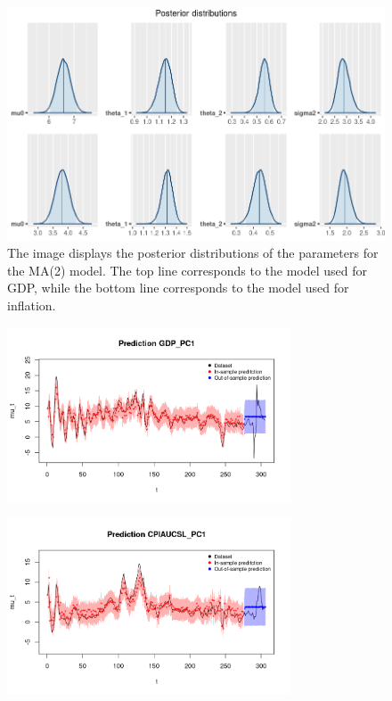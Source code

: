 \begin{figure}[H]
    \centering
    \includegraphics[width=\textwidth]{images/3-MA/posteriors2.png}
    \caption{The image displays the posterior distributions of the parameters for the MA(2) model. The top line corresponds to the model used for GDP, while the bottom line corresponds to the model used for inflation.}
    \label{fig:MA2_posteriors}
\end{figure}

\begin{figure}[H]
    \centering
    \includegraphics[width=0.75\textwidth]{images/3-MA/gdp_prediction2.png}
    \label{fig:MA2_first}
\end{figure}
\begin{figure}[H]
    \centering
    \includegraphics[width=0.75\textwidth]{images/3-MA/infl_prediction2.png}
    \label{fig:MA2_second}
\end{figure}